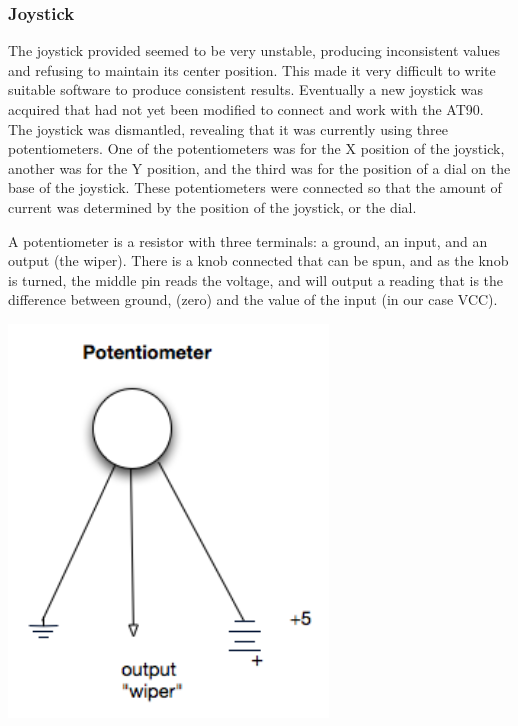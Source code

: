 \begin{minipage}{6.5in}
\begin{minipage}{6.5in}
\subsubsection{Joystick}
\label{sec:JoystickConst}
The joystick provided seemed to be very unstable, producing inconsistent values and refusing to maintain its center position. This made it very difficult to write suitable software to produce consistent results. Eventually a new joystick was acquired that had not yet been modified to connect and work with the AT90. The joystick was dismantled, revealing that it was currently using three potentiometers. One of the potentiometers was for the X position of the joystick, another was for the Y position, and the third was for the position of a dial on the base of the joystick. These potentiometers were connected so that the amount of current was determined by the position of the joystick, or the dial.

A potentiometer is a resistor with three terminals: a ground, an input, and an output (the wiper). There is a knob connected that can be spun, and as the knob is turned, the middle pin reads the voltage, and will output a reading that is the difference between ground, (zero) and the value of the input (in our case VCC).

\begin{minipage}{6.5in}
\begin{center}
  \includegraphics[width=85mm]{imageSources/joystickPotentiometer.png}
\end{center}
\label{joystickPotentiometer}
\end{minipage}


\end{minipage}
\end{minipage}
